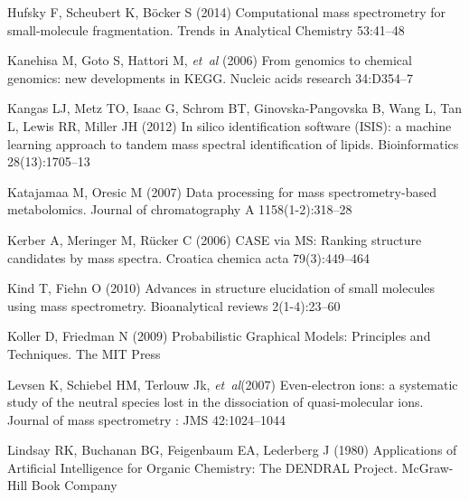 \begin{thebibliography}{38}
Hufsky F, Scheubert K, B\"{o}cker S (2014) {Computational mass spectrometry for
  small-molecule fragmentation}. Trends in Analytical Chemistry 53:41--48

Kanehisa M, Goto S, Hattori M, \emph{et~al} (2006) {From genomics to chemical genomics: new
  developments in KEGG.} Nucleic acids research 34:D354--7

Kangas LJ, Metz TO, Isaac G, Schrom BT, Ginovska-Pangovska B, Wang L, Tan L,
  Lewis RR, Miller JH (2012) {In silico identification software (ISIS): a
  machine learning approach to tandem mass spectral identification of lipids.}
  Bioinformatics 28(13):1705--13

Katajamaa M, Oresic M (2007) {Data processing for mass spectrometry-based
  metabolomics.} Journal of chromatography A 1158(1-2):318--28

Kerber A, Meringer M, R\"{u}cker C (2006) {CASE via MS: Ranking structure
  candidates by mass spectra}. Croatica chemica acta 79(3):449--464

Kind T, Fiehn O (2010) {Advances in structure elucidation of small molecules
  using mass spectrometry.} Bioanalytical reviews 2(1-4):23--60

Koller D, Friedman N (2009) {Probabilistic Graphical Models: Principles and
  Techniques}. The MIT Press

Levsen K, Schiebel HM, Terlouw Jk, \emph{et~al}(2007) {Even-electron ions: a systematic study of the neutral
  species lost in the dissociation of quasi-molecular ions}. Journal of mass
  spectrometry : JMS 42:1024--1044

Lindsay RK, Buchanan BG, Feigenbaum EA, Lederberg J (1980) {Applications of
  Artificial Intelligence for Organic Chemistry: The DENDRAL Project}.
  McGraw-Hill Book Company


\end{thebibliography}
